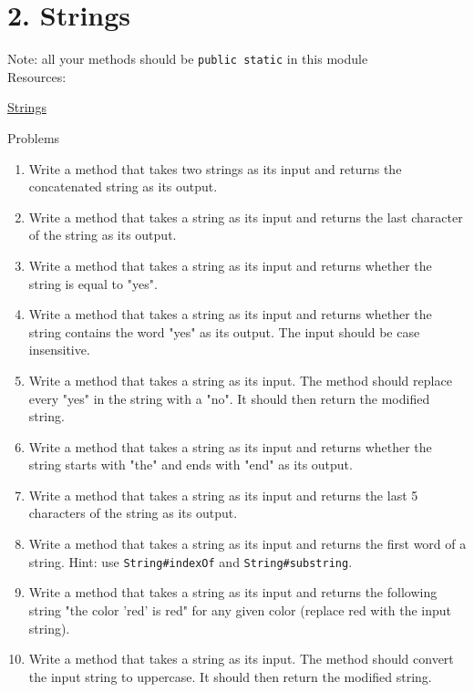 \documentclass[12pt,letterpaper]{article}
\newcommand\hwnumber{2}
\begin{document}
\section*{\hwnumber. Strings}
Note: all your methods should be \lstinline{public static} in this module \\
Resources:
\begin{description}
    \item \href{http://tutorials.jenkov.com/java/strings.html}{Strings}
\end{description}


Problems
\begin{enumerate}
\item
Write a method that takes two strings as its input and returns the concatenated string as its output.

\item
Write a method that takes a string as its input and returns the last character of the string as its output.

\item
Write a method that takes a string as its input and returns whether the string is equal to "yes".

\item
Write a method that takes a string as its input and returns whether the string contains the word "yes" as its output.
The input should be case insensitive.

\item
Write a method that takes a string as its input. The method should replace every "yes" in the string with a "no".
It should then return the modified string.

\item
Write a method that takes a string as its input and returns whether the string starts 
with "the" and ends with "end" as its output.

\item
Write a method that takes a string as its input and returns the last 5 characters of the string as its output.

\item
Write a method that takes a string as its input and returns the first word of a string.
Hint: use \lstinline{String#indexOf} and \lstinline{String#substring}.

\item
Write a method that takes a string as its input and returns the 
following string "the color 'red' is red" for any given color (replace red with the input string).

\item
Write a method that takes a string as its input. The method should convert the input string to uppercase.
It should then return the modified string.

\end{enumerate}
\end{document}
